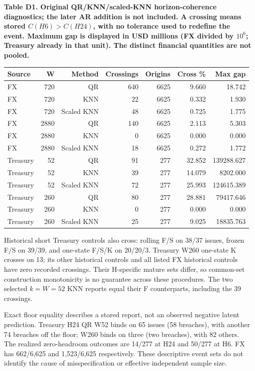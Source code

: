\documentclass[10pt,a4paper]{article}
\begin{document}
\begin{center}
\begin{minipage}{\linewidth}
\small\textbf{Table D1. Original QR/KNN/scaled-KNN horizon-coherence diagnostics; the later AR addition is not included. A crossing means stored \(C(H6)>C(H24)\), with no tolerance used to redefine the event. Maximum gap is displayed in USD millions (FX divided by \(10^6\); Treasury already in that unit). The distinct financial quantities are not pooled.}\par\medskip
\centering\fontsize{8}{10}\selectfont
\begin{tabular}{lrrrrrr}
\toprule
Source & W & Method & Crossings & Origins & Cross \% & Max gap \\
\midrule
FX & 720 & QR & 640 & 6625 & 9.660 & 18.742 \\
FX & 720 & KNN & 22 & 6625 & 0.332 & 1.930 \\
FX & 720 & Scaled KNN & 48 & 6625 & 0.725 & 1.775 \\
FX & 2880 & QR & 140 & 6625 & 2.113 & 5.303 \\
FX & 2880 & KNN & 0 & 6625 & 0.000 & 0.000 \\
FX & 2880 & Scaled KNN & 18 & 6625 & 0.272 & 1.772 \\
Treasury & 52 & QR & 91 & 277 & 32.852 & 139288.627 \\
Treasury & 52 & KNN & 39 & 277 & 14.079 & 8202.000 \\
Treasury & 52 & Scaled KNN & 72 & 277 & 25.993 & 124615.389 \\
Treasury & 260 & QR & 80 & 277 & 28.881 & 79417.646 \\
Treasury & 260 & KNN & 0 & 277 & 0.000 & 0.000 \\
Treasury & 260 & Scaled KNN & 25 & 277 & 9.025 & 18835.763 \\
\bottomrule
\end{tabular}
\end{minipage}
\end{center}
Historical short Treasury controls also cross: rolling F/S on 38/37 issues, frozen F/S on 39/39, and one-state F/S/K on 20/20/3. Treasury W260 one-state K crosses on 13; its other historical controls and all listed FX historical controls have zero recorded crossings. Their H-specific mature sets differ, so common-set construction monotonicity is no guarantee across these procedures. The two selected \(k=W=52\) KNN reports equal their F counterparts, including the 39 crossings.

Exact floor equality describes a stored report, not an observed negative latent prediction. Treasury H24 QR W52 binds on 65 issues (58 breaches), with another 74 breaches off the floor; W260 binds on three (two breaches), with 82 others. The realized zero-headroom outcomes are 14/277 at H24 and 50/277 at H6. FX has 662/6,625 and 1,523/6,625 respectively. These descriptive event sets do not identify the cause of misspecification or effective independent sample size.
\end{document}
